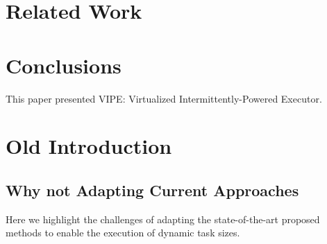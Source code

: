 \documentclass[pageno]{jpaper}
\newcommand{\sys}{VIPE\xspace}
\newcommand{\sysfull}{Virtualized Intermittently-Powered Executor\xspace}
\begin{document}
\section{Related Work}
\label{sec:related_work}

\section{Conclusions}
\label{sec:conclusions}

This paper presented \sys: \sysfull.


\newpage

\section{Old Introduction}






\subsection{Why not Adapting Current Approaches}

Here we highlight the challenges of adapting the state-of-the-art proposed methods to enable the execution of dynamic task sizes. 
%
\end{document}
